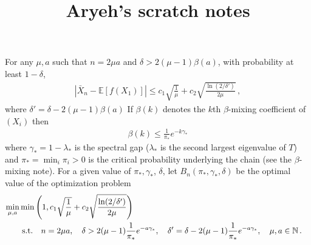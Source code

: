 \documentclass[11pt]{article}
\title{Aryeh's scratch notes}
\newcommand{\EE}[1]{\mathbb{E}\left[#1\right]}
\theoremstyle{plain}
\theoremstyle{definition}
\theoremstyle{remark}
\newcommand{\oo}[1]{\frac{1}{#1}}
\begin{document}
\maketitle


\newcommand{\XX}{\mathbb{X}}
\newcommand{\one}[1]{\mathbb{I}\left\{#1\right\}}
\newcommand{\N}{\mathbb{N}}
For any $\mu,a$ such that $n = 2\mu a$ and $\delta>2(\mu-1)\beta(a)$,
with probability at least $1-\delta$,
\begin{align}
\label{eq:xbound}
|\bar{X}_n - \EE{f(X_1)}|
\le c_1\sqrt{\frac{1}{\mu}} + c_2\sqrt{\frac{\ln(2/\delta')}{2\mu}}\,,
\end{align}
where $\delta'=\delta-2(\mu-1)\beta(a)$
If $\beta(k)$ denotes the $k$th $\beta$-mixing coefficient of $(X_i)$ then 
\begin{align}
\label{eq:betabound}
 \beta(k) \le \oo{\pi_*}e^{-k \gamma_*}
\end{align}
where  $\gamma_* = 1-\lambda_*$ is the spectral gap ($\lambda_*$ is the second largest eigenvalue of $T$)
and  $\pi_*  = \min_i \pi_i>0$ is the critical probability underlying the chain
(see the $\beta$-mixing note).
For a given value of $\pi_*,\gamma_*$, $\delta$, let $B_n(\pi_*,\gamma_*,\delta)$ be the optimal value of the optimization problem
\begin{align*}
\lefteqn{ \min_{\mu,a} \min\left(1, 
c_1\sqrt{\frac{1}{\mu}} + c_2\sqrt{\frac{\ln(2/\delta')}{2\mu}}\right) 
} \\
& \qquad \text{s.t.} \quad n = 2\mu a, \quad \delta>2(\mu-1)\oo{\pi_*}e^{-a \gamma_*},
\quad \delta' = \delta-2(\mu-1)\oo{\pi_*}e^{-a \gamma_*}, \quad \mu,a \in \N\,.
\end{align*}
\end{document}
